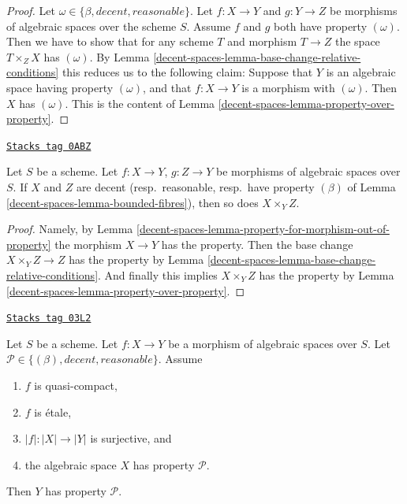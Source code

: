 \begin{proof}
Let $\omega \in \{\beta, decent, reasonable\}$.
Let $f : X \to Y$ and $g : Y \to Z$ be morphisms of algebraic spaces
over the scheme $S$. Assume $f$ and $g$ both have property
$(\omega)$. Then we have to show
that for any scheme $T$ and morphism $T \to Z$ the space $T \times_Z X$
has $(\omega)$. By
Lemma \ref{decent-spaces-lemma-base-change-relative-conditions}
this reduces us to the following claim: Suppose that $Y$ is an algebraic
space having property $(\omega)$, and that $f : X \to Y$ is a morphism
with $(\omega)$. Then $X$ has $(\omega)$.
This is the content of Lemma \ref{decent-spaces-lemma-property-over-property}.
\end{proof}

\begin{lemma}
\label{decent-spaces-lemma-fibre-product-conditions}
\href{https://stacks.math.columbia.edu/tag/0ABZ}{\texttt{Stacks tag 0ABZ}}

Let $S$ be a scheme. Let $f : X \to Y$, $g : Z \to Y$ be morphisms
of algebraic spaces over $S$. If $X$ and $Z$ are decent
(resp.\ reasonable, resp.\ have property
$(\beta)$ of Lemma \ref{decent-spaces-lemma-bounded-fibres}), then so does $X \times_Y Z$.
\end{lemma}

\begin{proof}
Namely, by Lemma \ref{decent-spaces-lemma-property-for-morphism-out-of-property}
the morphism $X \to Y$ has the property. Then the base change
$X \times_Y Z \to Z$ has the property by
Lemma \ref{decent-spaces-lemma-base-change-relative-conditions}.
And finally this implies $X \times_Y Z$ has the
property by Lemma \ref{decent-spaces-lemma-property-over-property}.
\end{proof}

\begin{lemma}
\label{decent-spaces-lemma-descent-conditions}
\href{https://stacks.math.columbia.edu/tag/03L2}{\texttt{Stacks tag 03L2}}

Let $S$ be a scheme.
Let $f : X \to Y$ be a morphism of algebraic spaces over $S$.
Let $\mathcal{P} \in \{(\beta), decent, reasonable\}$.
Assume
\begin{enumerate}
\item $f$ is quasi-compact,
\item $f$ is \'etale,
\item $|f| : |X| \to |Y|$ is surjective, and
\item the algebraic space $X$ has property $\mathcal{P}$.
\end{enumerate}
Then $Y$ has property $\mathcal{P}$.
\end{lemma}

